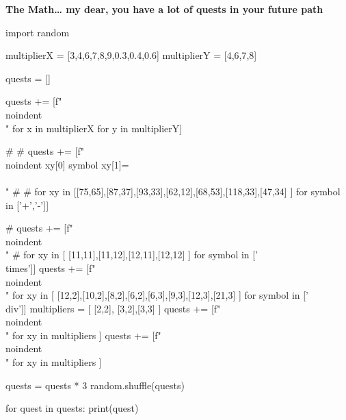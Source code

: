 \documentclass[12pt]{article}
\begin{document}
\begin{center}
  \LARGE 
  \textbf{ The Math… my dear, you have a lot of quests in your future path } \\
\end{center}
\begin{multicols}{4}

\begin{pycode}
import random

multiplierX = [3,4,6,7,8,9,0.3,0.4,0.6]
multiplierY = [4,6,7,8]

quests = []

quests  += [f"\\noindent \\[ {x} \\times {y} = \\]" for x in multiplierX for y in multiplierY]

# # quests += [f"\\noindent {xy[0]} {symbol} {xy[1]}=\\\\\n" 
# #                   for xy in [[75,65],[87,37],[93,33],[62,12],[68,53],[118,33],[47,34] ]  for symbol in ['+','-']]

# quests += [f"\\noindent \\[ {xy[0]} {symbol} {xy[1]}= \\]" 
#                   for xy in [ [11,11],[11,12],[12,11],[12,12] ]  for symbol in ['\\times']]
quests += [f"\\noindent \\[ {xy[0]} {symbol} {xy[1]}=\\]" 
                  for xy in [ [12,2],[10,2],[8,2],[6,2],[6,3],[9,3],[12,3],[21,3] ]  for symbol in ['\\div']]
multipliers = [ [2,2], [3,2],[3,3] ]
quests += [f"\\noindent\\[\\frac{{{xy[0] * xy[1]}}}{{x}} = {xy[0]};\\  x=\\] " for xy in multipliers ]
quests += [f"\\noindent\\[\\frac{{x}}{{{xy[0]}}} = {xy[1]};\\  x=\\] " for xy in multipliers ] 

quests = quests * 3
random.shuffle(quests)

for quest in quests:
  print(quest)
\end{pycode}

\end{multicols}
\end{document}
